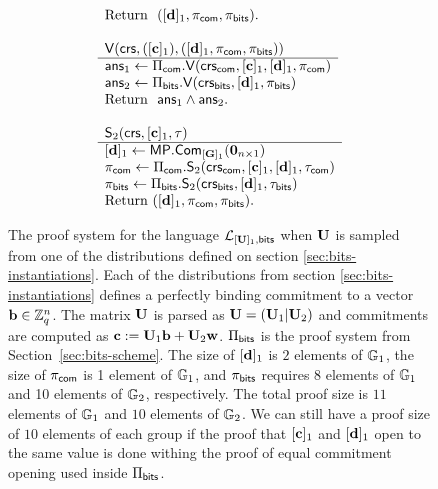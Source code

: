 \begin{figure}
\begin{\algSize}
$$\begin{array}{l}
\begin{array}{l}
\text{Return } \  ([\mathbf{d}]_1,\pi_{\mathsf{com}},\pi_{\mathsf{bits}}). \\
\\
\end{array}\\
\begin{array}{l}
{\mathsf{V}(\mathsf{crs},([\mathbf{c}]_1),([\mathbf{d}]_1,\pi_{\mathsf{com}},\pi_{\mathsf{bits}}))}\\
\hline
\mathsf{ans}_1 \gets \Pi_{\mathsf{com}}.\mathsf{V}(\mathsf{crs}_{\mathsf{com}},[\mathbf{c}]_1,[\mathbf{d}]_1,\pi_{\mathsf{com}})\\
\mathsf{ans}_2 \gets \Pi_{\mathsf{bits}}.\mathsf{V}(\mathsf{crs}_{\mathsf{bits}},[\mathbf{d}]_1,\pi_{\mathsf{bits}})\\
\text{Return } \ \mathsf{ans}_1\wedge\mathsf{ans}_2.
\\
\\
\end{array}
\\
\begin{array}{l}
{\mathsf{S}_2(\mathsf{crs},[\mathbf{c}]_1,\tau)}\\
\hline
{[\mathbf{d}]_1 \gets \mathsf{MP}.\mathsf{Com}_{[\mathbf{{G}}]_1}(\mathbf{0}_{n\times 1})}\\
\pi_{\mathsf{com}}\gets \Pi_{\mathsf{com}}.\mathsf{S}_2(\mathsf{crs}_{\mathsf{com}},[\mathbf{c}]_1,[\mathbf{d}]_1,\tau_{\mathsf{com}})\\
\pi_{\mathsf{bits}} \gets \Pi_{\mathsf{bits}}.\mathsf{S}_2(\mathsf{crs}_{\mathsf{bits}},[\mathbf{d}]_1,\tau_{\mathsf{bits}})\\
\text{Return }  ([\mathbf{d}]_1,\pi_{\mathsf{com}}, \pi_{\mathsf{bits}}).
\end{array}
\end{array}$$
\end{\algSize}
\caption{The proof system for the language $\mathcal{L}_{[\mathbf{{U}}]_1,\mathsf{bits}}$ when $\mathbf{{U}}$ is sampled from one of the distributions defined on section \ref{sec:bits-instantiations}. Each of the distributions from section \ref{sec:bits-instantiations} defines a perfectly binding commitment to a vector $\mathbf{b}\in\mathbb{Z}_q^n$. The matrix $\mathbf{{U}}$ is parsed as $\mathbf{{U}}=(\mathbf{U}_1|\mathbf{{U}}_{2})$ and commitments are computed as $\mathbf{c}:=\mathbf{{U}}_1\mathbf{b}+\mathbf{{U}}_2\mathbf{w}$. $\Pi_{\mathsf{bits}}$ is the proof system from Section~\ref{sec:bits-scheme}. The size of $[{\mathbf{d}}]_1$ is $2$ elements of $\mathbb{G}_1$, the size of $\pi_{\mathsf{com}}$ is 1 element of $\mathbb{G}_1$, and $\pi_{\mathsf{bits}}$ requires $8$ elements of $\mathbb{G}_1$ and 10 elements of $\mathbb{G}_2$, respectively. The total proof size is $11$ elements of $\mathbb{G}_1$ and $10$ elements of $\mathbb{G}_2$. We can still have a proof size of $10$ elements of each group if the proof that $[\mathbf{c}]_1$ and $[\mathbf{d}]_1$ open to the same value is done withing the proof of equal commitment opening used inside $\Pi_{\mathsf{bits}}$.
\label{fig:bits-bind}
}
\end{figure}

